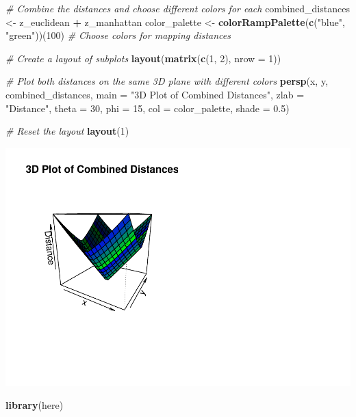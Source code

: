\documentclass[
]{article}
\newenvironment{Shaded}{\begin{snugshade}}{\end{snugshade}}
\newcommand{\AttributeTok}[1]{\textcolor[rgb]{0.13,0.29,0.53}{#1}}
\newcommand{\CommentTok}[1]{\textcolor[rgb]{0.56,0.35,0.01}{\textit{#1}}}
\newcommand{\DecValTok}[1]{\textcolor[rgb]{0.00,0.00,0.81}{#1}}
\newcommand{\FloatTok}[1]{\textcolor[rgb]{0.00,0.00,0.81}{#1}}
\newcommand{\FunctionTok}[1]{\textcolor[rgb]{0.13,0.29,0.53}{\textbf{#1}}}
\newcommand{\NormalTok}[1]{#1}
\newcommand{\OtherTok}[1]{\textcolor[rgb]{0.56,0.35,0.01}{#1}}
\newcommand{\SpecialCharTok}[1]{\textcolor[rgb]{0.81,0.36,0.00}{\textbf{#1}}}
\newcommand{\StringTok}[1]{\textcolor[rgb]{0.31,0.60,0.02}{#1}}
\begin{document}
\begin{Shaded}
\begin{Highlighting}[]
\CommentTok{\# Combine the distances and choose different colors for each}
\NormalTok{combined\_distances }\OtherTok{\textless{}{-}}\NormalTok{ z\_euclidean }\SpecialCharTok{+}\NormalTok{ z\_manhattan}
\NormalTok{color\_palette }\OtherTok{\textless{}{-}} \FunctionTok{colorRampPalette}\NormalTok{(}\FunctionTok{c}\NormalTok{(}\StringTok{"blue"}\NormalTok{, }\StringTok{"green"}\NormalTok{))(}\DecValTok{100}\NormalTok{)  }\CommentTok{\# Choose colors for mapping distances}

\CommentTok{\# Create a layout of subplots}
\FunctionTok{layout}\NormalTok{(}\FunctionTok{matrix}\NormalTok{(}\FunctionTok{c}\NormalTok{(}\DecValTok{1}\NormalTok{, }\DecValTok{2}\NormalTok{), }\AttributeTok{nrow =} \DecValTok{1}\NormalTok{))}

\CommentTok{\# Plot both distances on the same 3D plane with different colors}
\FunctionTok{persp}\NormalTok{(x, y, combined\_distances,}
      \AttributeTok{main =} \StringTok{"3D Plot of Combined Distances"}\NormalTok{,}
      \AttributeTok{zlab =} \StringTok{"Distance"}\NormalTok{,}
      \AttributeTok{theta =} \DecValTok{30}\NormalTok{, }\AttributeTok{phi =} \DecValTok{15}\NormalTok{,}
      \AttributeTok{col =}\NormalTok{ color\_palette, }\AttributeTok{shade =} \FloatTok{0.5}\NormalTok{)}

\CommentTok{\# Reset the layout}
\FunctionTok{layout}\NormalTok{(}\DecValTok{1}\NormalTok{)}
\end{Highlighting}
\end{Shaded}

\includegraphics{week1_files/figure-latex/unnamed-chunk-4-1.pdf}

\begin{Shaded}
\begin{Highlighting}[]
\FunctionTok{library}\NormalTok{(here)}
\end{Highlighting}
\end{Shaded}
\end{document}

